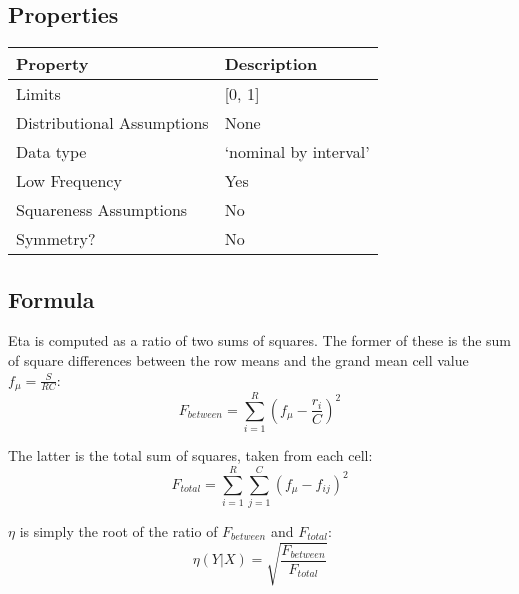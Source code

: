 \documentclass[11pt]{article}
\begin{document}
\subsection{Properties}
\begin{tabular}{| l || l |}
    \hline
    {\bf Property} & {\bf Description} \\
    \hline
    Limits & [0, 1] \\ \hline

    Distributional Assumptions& None \\ \hline

    Data type & `nominal by interval' \\ \hline

    Low Frequency & Yes \\ \hline

    Squareness Assumptions & No \\ \hline
    
    Symmetry? & No \\ \hline

\end{tabular}


\subsection{Formula}

Eta is computed as a ratio of two sums of squares.  The former of these is the sum of square differences between the row means and the grand mean cell value $f_\mu = \frac{S}{RC}$:
$$
F_{between} = \sum_{i=1}^{R}{    \left(   f_\mu -   \frac {r_i}{C} \right)^2  }
$$

The latter is the total sum of squares, taken from each cell:
$$
F_{total} = \sum_{i=1}^{R}{ \sum_{j=1}^{C}{   ( f_\mu - f_{ij} )^2    } }
$$

$\eta$ is simply the root of the ratio of $F_{between}$ and $F_{total}$:
$$
\eta(Y|X) = \sqrt{  \frac{ F_{between} }{ F_{total} }   }
$$
\end{document}

